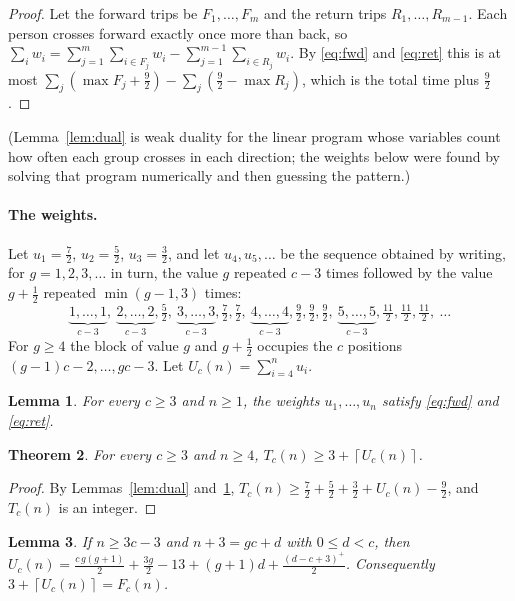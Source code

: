 \documentclass[11pt]{article}
\newtheorem{theorem}{Theorem}
\newtheorem{lemma}[theorem]{Lemma}
\theoremstyle{remark}
\newcommand{\ceil}[1]{\left\lceil #1\right\rceil}
\begin{document}
\begin{proof}
Let the forward trips be $F_1,\dots,F_m$ and the return trips $R_1,\dots,R_{m-1}$. Each person crosses forward exactly once more than back, so
$\sum_i w_i=\sum_{j=1}^m\sum_{i\in F_j}w_i-\sum_{j=1}^{m-1}\sum_{i\in R_j}w_i$. By \eqref{eq:fwd} and \eqref{eq:ret} this is at most $\sum_j(\max F_j+\frac92)-\sum_j(\frac92-\max R_j)$, which is the total time plus $\frac92$.
\end{proof}

(Lemma~\ref{lem:dual} is weak duality for the linear program whose variables count how often each group crosses in each direction; the weights below were found by solving that program numerically and then guessing the pattern.)

\paragraph{The weights.} Let $u_1=\frac72$, $u_2=\frac52$, $u_3=\frac32$, and let $u_4,u_5,\dots$ be the sequence obtained by writing, for $g=1,2,3,\dots$ in turn, the value $g$ repeated $c-3$ times followed by the value $g+\frac12$ repeated $\min(g-1,3)$ times:
\[
\underbrace{1,\dots,1}_{c-3},\ \underbrace{2,\dots,2}_{c-3},\tfrac52,\ \underbrace{3,\dots,3}_{c-3},\tfrac72,\tfrac72,\ \underbrace{4,\dots,4}_{c-3},\tfrac92,\tfrac92,\tfrac92,\ \underbrace{5,\dots,5}_{c-3},\tfrac{11}2,\tfrac{11}2,\tfrac{11}2,\ \dots
\]
For $g\ge4$ the block of value $g$ and $g+\frac12$ occupies the $c$ positions $(g-1)c-2,\dots,gc-3$. Let $U_c(n)=\sum_{i=4}^n u_i$.

\begin{lemma}\label{lem:feasible}
For every $c\ge3$ and $n\ge1$, the weights $u_1,\dots,u_n$ satisfy \eqref{eq:fwd} and \eqref{eq:ret}.
\end{lemma}

\begin{theorem}\label{thm:lower}
For every $c\ge3$ and $n\ge 4$, $T_c(n)\ge 3+\ceil{U_c(n)}$.
\end{theorem}

\begin{proof}
By Lemmas~\ref{lem:dual} and~\ref{lem:feasible}, $T_c(n)\ge \frac72+\frac52+\frac32+U_c(n)-\frac92$, and $T_c(n)$ is an integer.
\end{proof}

\begin{lemma}\label{lem:U}
If $n\ge 3c-3$ and $n+3=gc+d$ with $0\le d<c$, then
$U_c(n)=\frac{c\,g(g+1)}{2}+\frac{3g}{2}-13+(g+1)d+\frac{(d-c+3)^+}{2}$. Consequently $3+\ceil{U_c(n)}=F_c(n)$.
\end{lemma}
\end{document}
